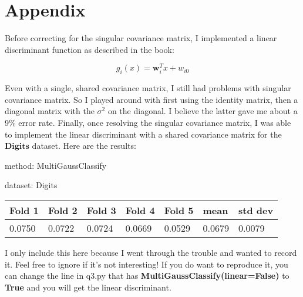 \documentclass{article}
\begin{document}
\section{Appendix}

Before correcting for the singular covariance matrix, I implemented a linear discriminant function as described in the book:

\begin{equation}
g_i(x) = \textbf{w}_i^T x + w_{i0}
\end{equation}

\noindent Even with a single, shared covariance matrix, I still had problems with singular covariance matrix.  So I played around with first using the identity matrix, then a diagonal matrix with the $\sigma^2$ on the diagonal.  I believe the latter gave me about a 9\% error rate.  Finally, once resolving the singular covariance matrix, I was able to implement the linear discriminant with a shared covariance matrix for the $\textbf{Digits}$ dataset.  Here are the results:

\noindent method: MultiGaussClassify

\noindent dataset: Digits

\begin{center}
	\begin{tabular}  { | l | l | l | l | l | l | l | }
	\hline
	Fold 1 & Fold 2 & Fold 3 & Fold 4 & Fold 5 & mean & std dev\\ \hline
	0.0750 & 0.0722 & 0.0724 & 0.0669 & 0.0529 & 0.0679 & 0.0079\\
	\hline
	\end{tabular}
\end{center}

\noindent I only include this here because I went through the trouble and wanted to record it.  Feel free to ignore if it's not interesting!  If you do want to reproduce it, you can change the line in q3.py that has \textbf{MultiGaussClassify(linear=False)} to \textbf{True} and you will get the linear discriminant.
\end{document}
